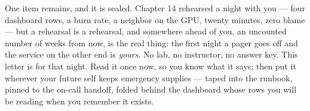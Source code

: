 \vspace{4.0pt}


One item remains, and it is sealed. Chapter 14 rehearsed a night with you — four dashboard rows, a burn rate, a neighbor on the GPU, twenty minutes, zero blame — but a rehearsal is a rehearsal, and somewhere ahead of you, an uncounted number of weeks from now, is the real thing: the first night a pager goes off and the service on the other end is \textit{yours}. No lab, no instructor, no answer key. This letter is for that night. Read it once now, so you know what it says; then put it wherever your future self keeps emergency supplies — taped into the runbook, pinned to the on-call handoff, folded behind the dashboard whose rows you will be reading when you remember it exists.

